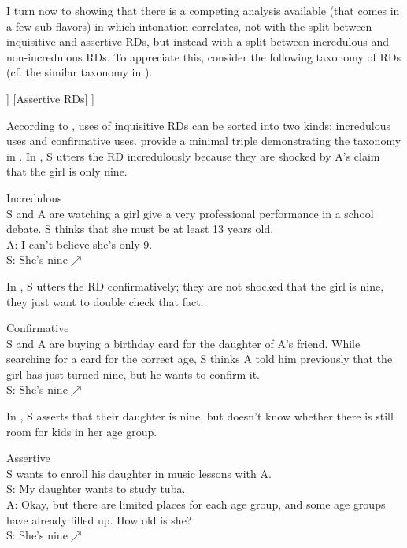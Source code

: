 \documentclass[output=paper,colorlinks,citecolor=brown]{langscibook}
\begin{document}
	\largerpage
	I turn now to showing that there is a competing analysis available (that comes in a few sub-flavors) in which intonation correlates, not with the split between inquisitive and assertive RDs, but instead with a split between incredulous and non-incredulous RDs. To appreciate this, consider the following taxonomy of RDs (cf. the similar taxonomy in \citealt{jeong18}).
	
	\exa
	\begin{forest}
	[{Taxonomy of Rising Declaratives}
	[{Inquisitive RDs}
	[{Incredulous RDs}]
	[{Confirmative RDs}]
	]	
	[{Assertive RDs}]
	] 
    \end{forest}
\label{tax}
	\z
	
	According to , uses of inquisitive RDs can be sorted into two kinds: incredulous uses and confirmative uses.  provide a minimal triple demonstrating the taxonomy in . In , S utters the RD incredulously because they are shocked by A's claim that the girl is only nine. 
	
	\exa Incredulous \\ 
	S and A are watching a girl give a very professional performance in a school debate. S thinks that she must be at least 13 years old.\\
	A: I can't believe she's only 9.\\
	S: She's nine$\nearrow$ \label{ird}
	\z
	
	In , S utters the RD confirmatively; they are not shocked that the girl is nine, they just want to double check that fact.
	
	\exa Confirmative \\ 
	S and A are buying a birthday card for the daughter of A's friend.  While searching for a card for the correct age, S thinks A told him previously that the girl has just turned nine, but he wants to confirm it.\\
	S: She's nine$\nearrow$ \label{crd}
	\z
	
	In , S asserts that their daughter is nine, but doesn't know whether there is still room for kids in her age group. 
	
	\exa Assertive \\  
	S wants to enroll his daughter in music lessons with A. \\ 
	S: My daughter wants to study tuba. \\
	A: Okay, but there are limited places for each age group, and some age groups have already filled up. How old is she?\\
	S: She's nine$\nearrow$\label{urd}
	\z
	
\end{document}
